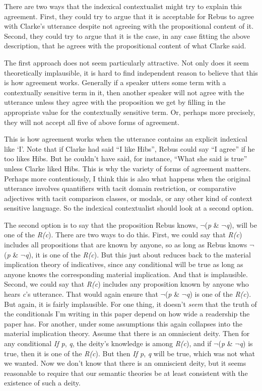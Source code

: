 There are two ways that the indexical contextualist might try to explain this agreement. First, they could try to argue that it is acceptable for Rebus to agree with Clarke's utterance despite not agreeing with the propositional content of it. Second, they could try to argue that it is the case, in any case fitting the above description, that he agrees with the propositional content of what Clarke said.

The first approach does not seem particularly attractive. Not only does it seem theoretically implausible, it is hard to find independent reason to believe that this is how agreement works. Generally if a speaker utters some term with a contextually sensitive term in it, then another speaker will not agree with the utterance unless they agree with the proposition we get by filling in the appropriate value for the contextually sensitive term. Or, perhaps more precisely, they will not accept all five of above forms of agreement. 

This is how agreement works when the utterance contains an explicit indexical like `I'. Note that if Clarke had said ``I like Hibs'', Rebus could say ``I agree'' if he too likes Hibs. But he couldn't have said, for instance, ``What she said is true'' unless Clarke liked Hibs. This is why the variety of forms of agreement matters. Perhaps more contentiously, I think this is also what happens when the original utterance involves quantifiers with tacit domain restriction, or comparative adjectives with tacit comparison classes, or modals, or any other kind of context sensitive language. So the indexical contextualist should look at a second option.

The second option is to say that the proposition Rebus knows, \(\neg\){}(\textit{p} \& \(\neg\){}\textit{q}), will be one of the \textit{R(c}). There are two ways to do this. First, we could say that \textit{R(c}) includes all propositions that are known by anyone, so as long as Rebus knows \(\neg\){}(\textit{p} \& \(\neg\){}\textit{q}), it is one of the \textit{R(c}). But this just about reduces back to the material implication theory of indicatives, since any conditional will be true as long as anyone knows the corresponding material implication. And that is implausible. Second, we could say that \textit{R(c}) includes any proposition known by anyone who hears \textit{c}'s utterance. That would again ensure that \(\neg\){}(\textit{p} \& \(\neg\){}\textit{q}) is one of the \textit{R(c}). But again, it is fairly implausible. For one thing, it doesn't \textit{seem} that the truth of the conditionals I'm writing in this paper depend on how wide a readership the paper has. For another, under some assumptions this again collapses into the material implication theory. Assume that there is an omniscient deity. Then for any conditional \textit{If p}, \textit{q}, the deity's knowledge is among \textit{R(c}), and if \(\neg\){}(\textit{p} \& \(\neg\){}\textit{q}) is true, then it is one of the \textit{R(c}). But then \textit{If p}, \textit{q} will be true, which was not what we wanted. Now we don't know that there is an omniscient deity, but it seems reasonable to require that our semantic theories be at least consistent with the existence of such a deity.

